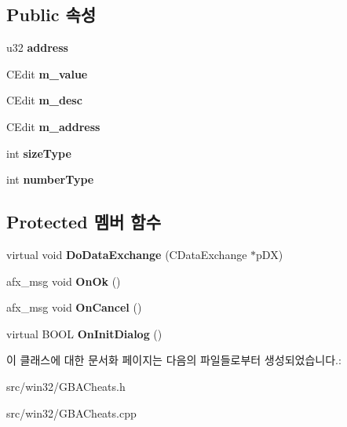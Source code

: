 \subsection*{Public 속성}
\begin{DoxyCompactItemize}
\item 
\mbox{\label{class_add_cheat_ae21ae20b0a2e3b936b9ecbacb13a2751}} 
u32 {\bfseries address}
\item 
\mbox{\label{class_add_cheat_aff9c3fd61a088f03dba1eb01e6956286}} 
C\+Edit {\bfseries m\+\_\+value}
\item 
\mbox{\label{class_add_cheat_a644f29b6dd8a0d26d5050054bdf2b054}} 
C\+Edit {\bfseries m\+\_\+desc}
\item 
\mbox{\label{class_add_cheat_a27ec0f498f3827cfc81c19d963c7fef5}} 
C\+Edit {\bfseries m\+\_\+address}
\item 
\mbox{\label{class_add_cheat_a7c3af367e51b1812d951dd2d24ac1aa8}} 
int {\bfseries size\+Type}
\item 
\mbox{\label{class_add_cheat_a50115e7ad42a106db574754cc81bc9a0}} 
int {\bfseries number\+Type}
\end{DoxyCompactItemize}
\subsection*{Protected 멤버 함수}
\begin{DoxyCompactItemize}
\item 
\mbox{\label{class_add_cheat_a9d3dbf5955873700caf71f41fa5117cc}} 
virtual void {\bfseries Do\+Data\+Exchange} (C\+Data\+Exchange $\ast$p\+DX)
\item 
\mbox{\label{class_add_cheat_ad3785b90d963668a87ff33fb93cf56d9}} 
afx\+\_\+msg void {\bfseries On\+Ok} ()
\item 
\mbox{\label{class_add_cheat_aef14a7fa535621c242e9007a7c0510e7}} 
afx\+\_\+msg void {\bfseries On\+Cancel} ()
\item 
\mbox{\label{class_add_cheat_a92017eb0efe50e09e7c3e5e4980a18cb}} 
virtual B\+O\+OL {\bfseries On\+Init\+Dialog} ()
\end{DoxyCompactItemize}


이 클래스에 대한 문서화 페이지는 다음의 파일들로부터 생성되었습니다.\+:\begin{DoxyCompactItemize}
\item 
src/win32/G\+B\+A\+Cheats.\+h\item 
src/win32/G\+B\+A\+Cheats.\+cpp\end{DoxyCompactItemize}
